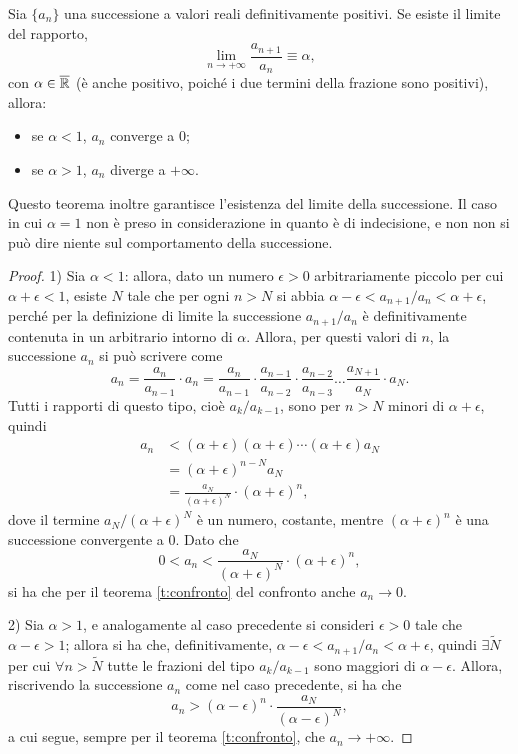 \begin{teorema}
\label{t:criterio_del_rapporto_successioni}
Sia $\{a_n\}$ una successione a valori reali definitivamente positivi. Se esiste il limite del rapporto,
\[
\lim_{n\to +\infty} \frac{a_{n+1}}{a_n}\equiv\alpha,
\]
con $\alpha\in\overline{\mathbb{R}}$ (è anche positivo, poiché i due termini della frazione sono positivi), allora:
\begin{itemize}
	\item se $\alpha<1$, $a_n$ converge a 0;
	\item se $\alpha>1$, $a_n$ diverge a $+\infty$.
\end{itemize}
\end{teorema}
Questo teorema inoltre garantisce l'esistenza del limite della successione. Il caso in cui $\alpha=1$ non è preso in considerazione in quanto è di indecisione, e non non si può dire niente sul comportamento della successione.
\begin{proof}
1) Sia $\alpha<1$: allora, dato un numero $\epsilon>0$ arbitrariamente piccolo per cui $\alpha+\epsilon<1$, esiste $N$ tale che per ogni $n>N$ si abbia $\alpha-\epsilon<a_{n+1}/a_n<\alpha+\epsilon$, perché per la definizione di limite la successione $a_{n+1}/a_n$ è definitivamente contenuta in un arbitrario intorno di $\alpha$. Allora, per questi valori di $n$, la successione $a_n$ si può scrivere come
\[
a_n=\frac{a_n}{a_{n-1}}\cdot a_n=\frac{a_n}{a_{n-1}}\cdot\frac{a_{n-1}}{a_{n-2}}\cdot\frac{a_{n-2}}{a_{n-3}}\dots \frac{a_{N+1}}{a_N}\cdot a_N.
\]
Tutti i rapporti di questo tipo, cioè $a_k/a_{k-1}$, sono per $n>N$ minori di $\alpha+\epsilon$, quindi
\[
\begin{split}
	a_n&<(\alpha+\epsilon)(\alpha+\epsilon)\cdots(\alpha+\epsilon)a_N\\
	&=(\alpha+\epsilon)^{n-N}a_N\\
	&=\frac{a_N}{(\alpha+\epsilon)^N}\cdot (\alpha+\epsilon)^n,
\end{split}
\]
dove il termine $a_N/(\alpha+\epsilon)^N$ è un numero, costante, mentre $(\alpha+\epsilon)^n$ è una successione convergente a 0. Dato che
\[
0<a_n<\frac{a_N}{(\alpha+\epsilon)^N}\cdot (\alpha+\epsilon)^n,
\]
si ha che per il teorema \ref{t:confronto} del confronto anche $a_n\to 0$.

2) Sia $\alpha>1$, e analogamente al caso precedente si consideri $\epsilon>0$ tale che $\alpha-\epsilon>1$; allora si ha che, definitivamente, $\alpha-\epsilon<a_{n+1}/a_n<\alpha+\epsilon$, quindi $\exists\tilde{N}$ per cui $\forall n>\tilde{N}$ tutte le frazioni del tipo $a_k/a_{k-1}$ sono maggiori di $\alpha-\epsilon$. Allora, riscrivendo la successione $a_n$ come nel caso precedente, si ha che
\[
a_n>(\alpha-\epsilon)^n\cdot\frac{a_N}{(\alpha-\epsilon)^N},
\]
a cui segue, sempre per il teorema \ref{t:confronto}, che $a_n\to +\infty$.
\end{proof}
